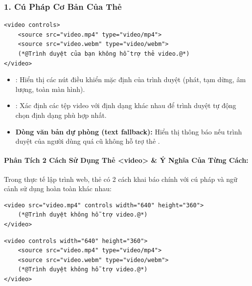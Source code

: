 \subsubsection{1. Cú Pháp Cơ Bản Của Thẻ }

\begin{codeWindow}
\begin{lstlisting}[language=HTML5]
<video controls>
    <source src="video.mp4" type="video/mp4">
    <source src="video.webm" type="video/webm">
    (*@Trình duyệt của bạn không hỗ trợ thẻ video.@*)
</video>
\end{lstlisting}
\end{codeWindow}

\begin{itemize}[leftmargin=1.5em, itemsep=2pt, parsep=0pt]
    \item {}: Hiển thị các nút điều khiển mặc định của trình duyệt (phát, tạm dừng, âm lượng, toàn màn hình).
    \item {}: Xác định các tệp video với định dạng khác nhau để trình duyệt tự động chọn định dạng phù hợp nhất.
    \item \textbf{Dòng văn bản dự phòng (text fallback):} Hiển thị thông báo nếu trình duyệt của người dùng quá cũ không hỗ trợ thẻ .
\end{itemize}

\paragraph{Phân Tích 2 Cách Sử Dụng Thẻ <video> \& Ý Nghĩa Của Từng Cách:}

Trong thực tế lập trình web, thẻ  có 2 cách khai báo chính với cú pháp và ngữ cảnh sử dụng hoàn toàn khác nhau:

\begin{codeWindow}
\begin{lstlisting}[language=HTML5]
<video src="video.mp4" controls width="640" height="360">
    (*@Trình duyệt không hỗ trợ video.@*)
</video>
\end{lstlisting}
\end{codeWindow}

\begin{codeWindow}
\begin{lstlisting}[language=HTML5]
<video controls width="640" height="360">
    <source src="video.mp4" type="video/mp4">
    <source src="video.webm" type="video/webm">
    (*@Trình duyệt không hỗ trợ video.@*)
</video>
\end{lstlisting}
\end{codeWindow}

